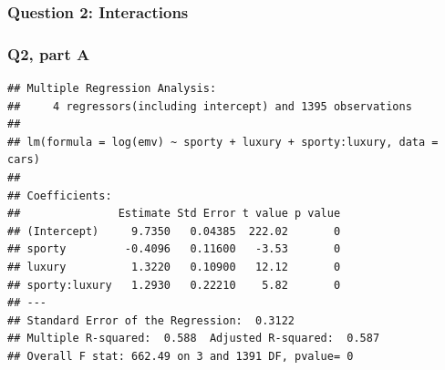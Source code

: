 \documentclass[
]{article}
\newenvironment{Shaded}{\begin{snugshade}}{\end{snugshade}}
\newcommand{\AttributeTok}[1]{\textcolor[rgb]{0.13,0.29,0.53}{#1}}
\newcommand{\FloatTok}[1]{\textcolor[rgb]{0.00,0.00,0.81}{#1}}
\newcommand{\FunctionTok}[1]{\textcolor[rgb]{0.13,0.29,0.53}{\textbf{#1}}}
\newcommand{\NormalTok}[1]{#1}
\newcommand{\OtherTok}[1]{\textcolor[rgb]{0.56,0.35,0.01}{#1}}
\newcommand{\SpecialCharTok}[1]{\textcolor[rgb]{0.81,0.36,0.00}{\textbf{#1}}}
\newcommand{\StringTok}[1]{\textcolor[rgb]{0.31,0.60,0.02}{#1}}
\begin{document}
\subsubsection{Question 2: Interactions}\label{question-2-interactions}

\subsubsection{Q2, part A}\label{q2-part-a}

\begin{Shaded}
\end{Shaded}

\begin{verbatim}
## Multiple Regression Analysis:
##     4 regressors(including intercept) and 1395 observations
## 
## lm(formula = log(emv) ~ sporty + luxury + sporty:luxury, data = cars)
## 
## Coefficients:
##               Estimate Std Error t value p value
## (Intercept)     9.7350   0.04385  222.02       0
## sporty         -0.4096   0.11600   -3.53       0
## luxury          1.3220   0.10900   12.12       0
## sporty:luxury   1.2930   0.22210    5.82       0
## ---
## Standard Error of the Regression:  0.3122
## Multiple R-squared:  0.588  Adjusted R-squared:  0.587
## Overall F stat: 662.49 on 3 and 1391 DF, pvalue= 0
\end{verbatim}

\begin{Shaded}
\end{Shaded}
\end{document}
